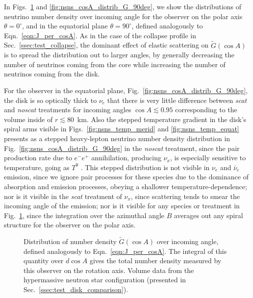 \documentclass[aps,floatfix,prd,superscriptaddress,twocolumn]{revtex4-1}
\begin{document}
In Figs.~\ref{fig:nsns_cosA_distrib_G_00deg}
and \ref{fig:nsns_cosA_distrib_G_90deg}, we show the distributions of neutrino
number density over incoming angle
for the observer on the polar axis $\theta=0^\circ$,
and in the equatorial plane $\theta=90^\circ$,
defined analogously to Eqn.~\ref{eqn:J_per_cosA}.
As in the case of the collapse profile in Sec.~\ref{ssec:test_collapse},
the dominant effect of elastic scattering on $\tilde{G}(\cos A)$
is to spread the distribution out to larger angles, by generally decreasing
the number of neutrinos coming from the core while increasing the number
of neutrinos coming from the disk.

For the observer in the equatorial plane,
Fig.~\ref{fig:nsns_cosA_distrib_G_90deg}, the disk is so optically thick to
$\nu_e$ that there is very little difference between \emph{scat} and
\emph{noscat} treatments for incoming angles $\cos A \lesssim 0.95$
corresponding to the volume inside of $r \lesssim 80$~km.
Also the stepped temperature gradient in the disk's spiral arms visible in
Figs.~\ref{fig:nsns_temp_merid} and \ref{fig:nsns_temp_equat} presents as a
stepped heavy-lepton neutrino number density distribution in
Fig.~\ref{fig:nsns_cosA_distrib_G_90deg} in the \emph{noscat} treatment,
since the pair production rate due to $e^{-}e^{+}$ annihilation,
producing $\nu_x$, is especially sensitive to temperature, going as
$T^9$ \cite[Sec.~7]{burr2006-neutrino_opacities}.
This stepped distribution is not visible in $\nu_e$ and $\bar{\nu}_e$ emission,
since we ignore pair processes for these species due to the dominance of
absorption and emission processes, obeying a shallower temperature-dependence;
nor is it visible in the \emph{scat} treatment of $\nu_x$, since scattering
tends to smear the incoming angle of the emission;
nor is it visible for any species or treatment in
Fig.~\ref{fig:nsns_cosA_distrib_G_00deg}, since the integration over the
azimuthal angle $B$ averages out any spiral structure for the observer
on the polar axis.

\begin{figure}
  \resizebox{\columnwidth}{!}{}
  \caption{Distribution of number density $\tilde{G}(\cos A)$ over incoming angle,
    defined analogously to Eqn.~\ref{eqn:J_per_cosA}.
    The integral of this quantity over $d\cos A$ gives the total number density
    measured by this observer on the rotation axis.
    Volume data from the hypermassive neutron star configuration
    (presented in Sec.~\ref{ssec:test_disk_comparison}).}
  \label{fig:nsns_cosA_distrib_G_00deg}
\end{figure}
\end{document}
